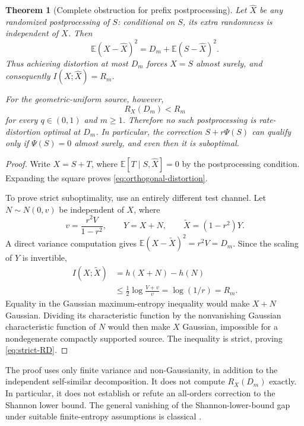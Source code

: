 \documentclass[11pt,a4paper]{article}
\numberwithin{equation}{section}
\newtheorem{theorem}{Theorem}[section]
\theoremstyle{definition}\newtheorem{definition}[theorem]{Definition}
\theoremstyle{remark}\newtheorem{remark}[theorem]{Remark}
\newcommand{\E}{\mathbb E}\newcommand{\Pp}{\mathbb P}
\begin{document}
\begin{theorem}[Complete obstruction for prefix postprocessing]
\label{thm:RD}
Let $\widehat X$ be any randomized postprocessing of $S$: conditional on $S$, its extra randomness is independent of $X$. Then
\begin{equation}
 \E(X-\widehat X)^2=D_m+\E(S-\widehat X)^2.
 \label{eq:orthogonal-distortion}
\end{equation}
Thus achieving distortion at most $D_m$ forces $\widehat X=S$ almost surely, and consequently $I(X;\widehat X)=R_m$.

For the geometric-uniform source, however,
\begin{equation}
 R_X(D_m)<R_m
 \label{eq:strict-RD}
\end{equation}
for every $q\in(0,1)$ and $m\ge1$. Therefore no such postprocessing is rate-distortion optimal at $D_m$. In particular, the correction $S+r\Psi(S)$ can qualify only if $\Psi(S)=0$ almost surely, and even then it is suboptimal.
\end{theorem}
\begin{proof}
Write $X=S+T$, where $\E[T\mid S,\widehat X]=0$ by the postprocessing condition. Expanding the square proves \eqref{eq:orthogonal-distortion}.

To prove strict suboptimality, use an entirely different test channel. Let $N\sim N(0,v)$ be independent of $X$, where
\[
 v=\frac{r^2V}{1-r^2},\qquad Y=X+N,\qquad \widetilde X=(1-r^2)Y.
\]
A direct variance computation gives $\E(X-\widetilde X)^2=r^2V=D_m$. Since the scaling of $Y$ is invertible,
\begin{align*}
 I(X;\widetilde X)&=h(X+N)-h(N)\\
 &\le\frac12\log\frac{V+v}{v}=\log(1/r)=R_m.
\end{align*}
Equality in the Gaussian maximum-entropy inequality would make $X+N$ Gaussian. Dividing its characteristic function by the nonvanishing Gaussian characteristic function of $N$ would then make $X$ Gaussian, impossible for a nondegenerate compactly supported source. The inequality is strict, proving \eqref{eq:strict-RD}.
\end{proof}
The proof uses only finite variance and non-Gaussianity, in addition to the independent self-similar decomposition. It does not compute $R_X(D_m)$ exactly. In particular, it does not establish or refute an all-orders correction to the Shannon lower bound. The general vanishing of the Shannon-lower-bound gap under suitable finite-entropy assumptions is classical \cite{koch}.
\end{document}

